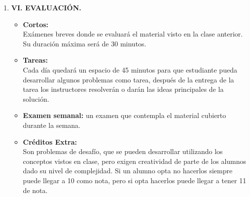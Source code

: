 \begin{enumerate}
\begin{enumerate}
    \item Clases expositiva: las clases serán desarrolladas por los educadores modelo;
especialmente, se orientará al estudiante por medio de guías que desarrollará por su cuenta,
con la finalidad de descubrir y determinar conceptos, fórmulas y propiedades por sí mismos.
\item  Discusión de problemas: se desarrollarán en un espacio de una hora despues del primer bloque de clase. Se buscará que los estudiantes desarrollen, o refuercen sus habilidades para la resolución de problemas con mayor dificultad. 
\item  Tareas: se asignará una tarea diaria para resolver en el aula, luego los instructores modelo resolverán o derán las ideas principales para la solución de esta.
\item  Evaluaciones cortas: se desarrollará exámenes cortos de lo que se vio el día anterior, por lo que los exámenes cortos serán todos los días a excepción del día lunes.
\item Examen semanal: evaluación que se realizará el sábado de cada semana e incluye el contenido estudiado a lo largo de toda semana.

\end{enumerate}

\item  {\bf\large  VI.  EVALUACI\'ON.}
\begin{itemize}
\item \textbf{ Cortos:}\\ Ex\'amenes breves donde se evaluar\'a el material visto en la clase anterior. Su
duración m\'axima será de 30 minutos.\\

\item \textbf{ Tareas:}\\
 Cada día quedará un espacio de 45 minutos para que estudiante pueda desarrollar algunos problemas como tarea, después de la entrega de la tarea los instructores resolverán o darán las ideas principales de la solución.\\

\item \textbf{ Examen semanal:} un examen que contempla el material cubierto durante la semana.\\

\item \textbf{ Cr\'editos Extra:}\\
 Son problemas de desaf\'io,  que se pueden desarrollar utilizando
los conceptos vistos en clase,  pero exigen creatividad de parte de los alumnos dado su nivel
de complejidad. Si un alumno opta no hacerlos siempre puede llegar a 10 como nota, pero
si opta hacerlos puede llegar a tener 11 de nota.


\end{itemize}
\end{enumerate}
